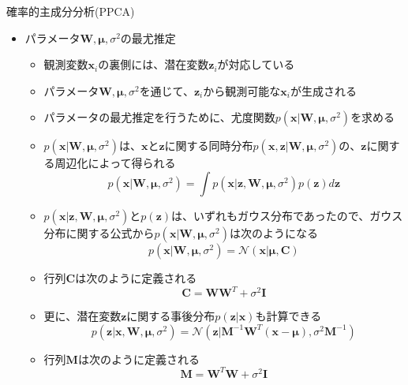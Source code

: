 \documentclass[dvipdfmx,notheorems,t]{beamer}
\begin{document}
\begin{frame}{確率的主成分分析(PPCA)}

\begin{itemize}
	\item パラメータ$\bm{W}, \bm{\mu}, \sigma^2$の最尤推定
	\begin{itemize}
		\item 観測変数$\bm{x}_i$の裏側には、潜在変数$\bm{z}_i$が対応している
		\item パラメータ$\bm{W}, \bm{\mu}, \sigma^2$を通じて、$\bm{z}_i$から観測可能な$\bm{x}_i$が生成される
		\newline
		
		\item パラメータの最尤推定を行うために、尤度関数$p(\bm{x} | \bm{W}, \bm{\mu}, \sigma^2)$を求める
		\newline
		
		\item $p(\bm{x} | \bm{W}, \bm{\mu}, \sigma^2)$は、$\bm{x}$と$\bm{z}$に関する同時分布$p(\bm{x}, \bm{z} | \bm{W}, \bm{\mu}, \sigma^2)$の、$\bm{z}$に関する周辺化によって得られる
		\begin{equation}
			p(\bm{x} | \bm{W}, \bm{\mu}, \sigma^2) = \int p(\bm{x} | \bm{z}, \bm{W}, \bm{\mu}, \sigma^2) p(\bm{z}) d\bm{z}
		\end{equation}
		
		\item $p(\bm{x} | \bm{z}, \bm{W}, \bm{\mu}, \sigma^2)$と$p(\bm{z})$は、いずれもガウス分布であったので、ガウス分布に関する公式から$p(\bm{x} | \bm{W}, \bm{\mu}, \sigma^2)$は次のようになる
		\begin{equation}
			p(\bm{x} | \bm{W}, \bm{\mu}, \sigma^2) = \mathcal{N}(\bm{x} | \bm{\mu}, \bm{C})
		\end{equation}
		
		\item 行列$\bm{C}$は次のように定義される
		\begin{equation}
			\bm{C} = \bm{W} \bm{W}^T + \sigma^2 \bm{I}
		\end{equation}
		
		\item 更に、潜在変数$\bm{z}$に関する事後分布$p(\bm{z} | \bm{x})$も計算できる
		\begin{equation}
			p(\bm{z} | \bm{x}, \bm{W}, \bm{\mu}, \sigma^2) = \mathcal{N}(\bm{z} | \bm{M}^{-1} \bm{W}^T (\bm{x} - \bm{\mu}), \sigma^2 \bm{M}^{-1})
		\end{equation}
		
		\item 行列$\bm{M}$は次のように定義される
		\begin{equation}
			\bm{M} = \bm{W}^T \bm{W} + \sigma^2 \bm{I}
		\end{equation}
		

\end{itemize}
\end{itemize}
\end{frame}
\end{document}
